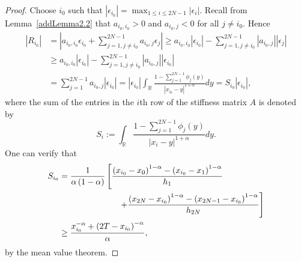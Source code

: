 \documentclass[smallextended]{svjour3}       %
\begin{document}
\begin{proof}
Choose $i_0$ such that $| \epsilon_{i_{0}} |  = \max_{1\leq i \leq 2N-1} |\epsilon_{i}|$. 
Recall from Lemma~\ref{addLemma2.2} that \mbox{$a_{i_0,i_0}>0$} and $a_{i_0,j}<0$ for all $j\ne i_0$. Hence
\begin{align*}
|R_{i_{0}}|	&= \left| a_{i_{0},i_{0}} \epsilon_{i_{0}} + \sum_{j=1,j\neq i_{0}}^{2N-1} a_{i_{0},j}\epsilon_{j} \right|
	\geq a_{i_{0},i_{0}} \left|\epsilon_{i_{0}}\right| - \sum_{j=1,j\neq i_{0}}^{2N-1}  \left| a_{i_{0},j} \right| \left|\epsilon_{j} \right| \\
	& \geq a_{i_{0},i_{0}} \left|\epsilon_{i_{0}}\right| - \sum_{j=1,j\neq i_{0}}^{2N-1} \left| a_{i_{0},j} \right| \left|\epsilon_{i_{0}} \right|\\
	&= \sum_{j=1}^{2N-1}{a_{i_{0},j}}  \left|\epsilon_{i_{0}} \right| %
= \left|\epsilon_{i_{0}} \right| \int_{\mathbb{R}}{\frac{1-\sum_{j=1}^{2N-1}{\phi _j\left( y \right)}}
		{\left| x_{i_{0}}-y \right|^{1+\alpha}}dy} %
= S_{i_{0}} \left|\epsilon_{i_{0}} \right|,
\end{align*}
where the sum of the entries in the $i$th row of the stiffness matrix $A$ is denoted by 
\begin{equation}\label{sumA}
 S_{i}:=\int_{\mathbb{R}}{\frac{1-\sum_{j=1}^{2N-1}{\phi _j\left( y \right)}}
		{\left| x_{i}-y \right|^{1+\alpha}}dy}. 
\end{equation}
One can verify that 
\begin{align*}
S_{i_{0}} &= \frac{1}{\alpha \left( 1-\alpha \right)}\left[ \frac{\left( x_{i_{0}}-x_0 \right)^{1-\alpha}  
				- \left( x_{i_{0}}-x_1 \right)^{1-\alpha}}{h_1}   \right. \\
		&\hspace{25mm}  \left. + \frac{\left( x_{2N}-x_{i_{0}} \right) ^{1-\alpha} 
			 - \left( x_{{2N}-1}-x_{i_{0}} \right)^{1-\alpha}}{h_{2N}} \right]\\
		&\geq  \frac{ x_{i_{0}}^{-\alpha}+\left(2T-x_{i_{0}} \right)^{-\alpha}  }{\alpha},
\end{align*}
by the mean value theorem.
	

\end{proof}
\end{document}
